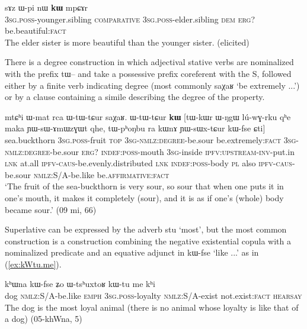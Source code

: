 \documentclass[oldfontcommands,oneside,a4paper,11pt]{article}
\newcommand{\ipa}[1]{{\phon#1}} %
\newcommand{\refb}[1]{(\ref{#1})}
\newcommand{\factual}[1]{\textsc{:fact}}
\begin{document}
\begin{exe}
\ex \label{ex:comp1}
\gll  \ipa{ɯ-ʁi}   	\ipa{sɤz}   	\ipa{ɯ-pi}   	\ipa{nɯ}   	\ipa{\textbf{kɯ}}   	\ipa{mpɕɤr}     \\
\textsc{3sg.poss}-younger.sibling \textsc{comparative} \textsc{3sg.poss}-elder.sibling \textsc{dem} \textsc{erg?}   be.beautiful\factual{} \\
\glt The elder sister is more beautiful than the younger sister. (elicited)
\end{exe}

There is a degree construction in which adjectival stative verbs are nominalized with the prefix \ipa{tɯ--} and take a possessive prefix coreferent with the S, followed either by a finite verb indicating degree (most commonly \ipa{saχaʁ} `be extremely ...') or by a clause containing a simile describing the degree of the property.


\begin{exe}
\ex \label{ex:YWsWxtCur}
\gll 
\ipa{mtɕʰi}  	\ipa{ɯ-mat}  	\ipa{rca}  	\ipa{ɯ-tɯ-tɕur}  	\ipa{saχaʁ.}  	\ipa{ɯ-tɯ-tɕur}  	\ipa{\textbf{kɯ}}  	[\ipa{tɯ-kɯr}  	\ipa{ɯ-ŋgɯ}  	\ipa{lú-wɣ-rku}  	\ipa{qʰe}  	\ipa{maka}  	\ipa{ɲɯ-sɯ-ɤmɯzɣɯt}  	\ipa{qhe,}  	\ipa{tɯ-pʰoŋbu}  	\ipa{ra}  	\ipa{kɯnɤ}  	\ipa{ɲɯ-sɯx-tɕur}  	\ipa{kɯ-fse}  	\ipa{ɕti}]  \\
sea.buckthorn \textsc{3sg.poss}-fruit \textsc{top} \textsc{3sg-nmlz:degree}-be.sour  be.extremely\factual{} \textsc{3sg-nmlz:degree}-be.sour \textsc{erg?} \textsc{indef:poss}-mouth \textsc{3sg}-inside \textsc{ipfv:upstream-inv}-put.in \textsc{lnk} at.all \textsc{ipfv-caus}-be.evenly.distributed \textsc{lnk} \textsc{indef:poss}-body \textsc{pl} also \textsc{ipfv-caus}-be.sour \textsc{nmlz:S/A}-be.like  be.\textsc{affirmative}\factual{} \\
\glt `The fruit of the sea-buckthorn is very sour, so sour that when one puts it in one's mouth, it makes it completely (sour), and it is as if one's (whole) body became sour.' (09 mi, 66)
\end{exe}

Superlative can be expressed by the adverb \ipa{stu} `most', but the most common construction is a construction combining the negative existential copula with a nominalized predicate and an equative adjunct in \ipa{kɯ-fse} `like ...' as in \refb{ex:kWtu.me}.

\begin{exe}
\ex \label{ex:kWtu.me}
\gll 
\ipa{kʰɯna}  	\ipa{kɯ-fse}  	\ipa{ʑo} 	\ipa{ɯ-tsʰuxtoʁ}  	\ipa{kɯ-tu}  	\ipa{me}  	\ipa{kʰi} \\  
dog \textsc{nmlz}:S/A-be.like  \textsc{emph} \textsc{3sg.poss}-loyalty \textsc{nmlz}:S/A-exist  not.exist\factual{} \textsc{hearsay} \\
\glt The dog is the most loyal animal (there is no animal whose loyalty is like that of a dog) (05-khWna, 5)
\end{exe}
\end{document}
